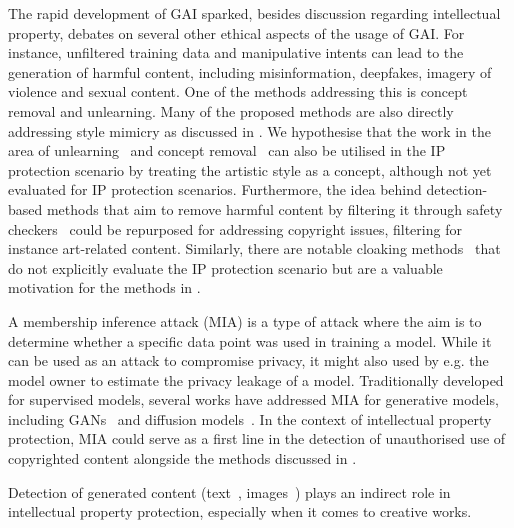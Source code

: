 The rapid development of GAI sparked, besides discussion regarding intellectual property, debates on several other ethical aspects of the usage of GAI. 
For instance, unfiltered training data and manipulative intents can lead to the generation of harmful content, including misinformation, deepfakes, imagery of violence and sexual content. 
One of the methods addressing this is concept removal and unlearning. 
Many of the proposed methods are also directly addressing style mimicry as discussed in . 
We hypothesise that the work in the area of unlearning~\cite{wu_erasediff_2024} and concept removal~\cite{liu_geom-erasing_2023,ho_classifier-free_2022} can also be utilised in the IP protection scenario by treating the artistic style as a concept, although not yet evaluated for IP protection scenarios. 
Furthermore, the idea behind detection-based methods that aim to remove harmful content by filtering it through safety checkers~\cite{rando_red-teaming_2022} could be repurposed for addressing copyright issues, filtering for instance art-related content.
Similarly, there are notable cloaking methods~\cite{shan_fawkes_2020} that do not explicitly evaluate the IP protection scenario but are a valuable motivation for the methods in .

A membership inference attack (MIA) is a type of attack where the aim is to determine whether a specific data point was used in training a model. 
While it can be used as an attack to compromise privacy, it might also used by e.g. the model owner to estimate the privacy leakage of a model. 
Traditionally developed for supervised models, several works have addressed MIA for generative models, including GANs~\cite{webster_this_2021,hayes_logan_2018} and diffusion models~\cite{matsumoto_membership_2023,hu_membership_2023}. 
In the context of intellectual property protection, MIA could serve as a first line in the detection of unauthorised use of copyrighted content alongside the methods discussed in . 

Detection of generated content (text~\cite{noauthor_science_2024}, images~\cite{liu_detecting_2022}) plays an indirect role in intellectual property protection, especially when it comes to creative works. 

